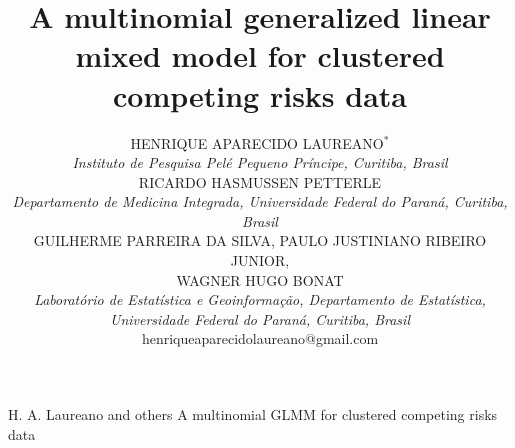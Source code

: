 \documentclass[oupdraft]{bio}
\begin{document}
\title{
  A multinomial generalized linear mixed model for clustered competing
  risks data
}

\author{HENRIQUE APARECIDO LAUREANO$^\ast$\\
        \textit{Instituto de Pesquisa Pel\'{e} Pequeno Pr\'{i}ncipe,
                Curitiba, Brasil}\\
        RICARDO HASMUSSEN PETTERLE\\
        \textit{Departamento de Medicina Integrada,
                Universidade Federal do Paran\'{a}, Curitiba, Brasil}\\
        GUILHERME PARREIRA DA SILVA, PAULO JUSTINIANO RIBEIRO JUNIOR,\\
        WAGNER HUGO BONAT\\
        \textit{Laborat\'{o}rio de Estat\'{i}stica e
                Geoinforma\c{c}\~{a}o,
                Departamento de Estat\'{i}stica,
                Universidade Federal do Paran\'{a}, Curitiba, Brasil}\\
{henriqueaparecidolaureano@gmail.com}}

\markboth%
{H. A. Laureano and others}
{A multinomial GLMM for clustered competing risks data}

\maketitle

\end{document}
